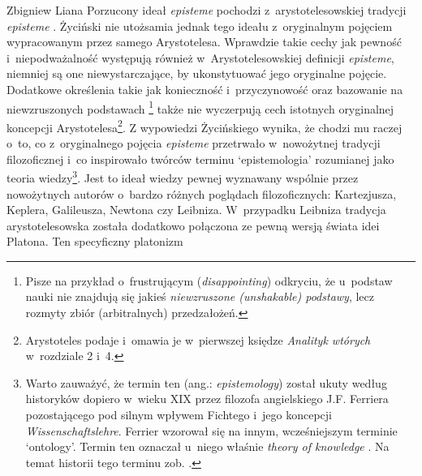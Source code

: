 \begin{artplenv}{Zbigniew Liana}
Porzucony ideał \textit{episteme} pochodzi z~arystotelesowskiej tradycji \textit{episteme}
\parencites[s.~102]{zycinski_jezyk_1983}[s.~46–55]{zycinski_granice_1993}.
Życiński nie utożsamia jednak tego ideału z~oryginalnym pojęciem wypracowanym
przez samego Arystotelesa. Wprawdzie takie cechy jak pewność i~niepodważalność występują również w~Arystotelesowskiej
definicji \textit{episteme}, niemniej są one niewystarczające, by ukonstytuować jego oryginalne pojęcie. Dodatkowe
określenia takie jak konieczność i~przyczynowość
\parencite[s.~46]{zycinski_granice_1993}
oraz bazowanie na
niewzruszonych podstawach
\parencites[s.~143]{zycinski_structure_1988}[s.~253]{zycinski_struktura_2013}\footnote{Pisze na
przykład o~frustrującym (\textit{disappointing})
odkryciu, że u~podstaw nauki nie znajdują się jakieś \textit{niewzruszone (unshakable) podstawy}, lecz rozmyty zbiór
(arbitralnych) przedzałożeń.} także nie wyczerpują cech istotnych oryginalnej koncepcji
Arystotelesa\footnote{Arystoteles podaje i~omawia je w~pierwszej księdze \textit{Analityk wtórych} w~rozdziale 2 i~4.}. Z
wypowiedzi Życińskiego
\parencite*[s.~46]{zycinski_granice_1993}
wynika, że chodzi mu raczej o~to, co z~oryginalnego
pojęcia \textit{episteme} przetrwało w~nowożytnej tradycji filozoficznej i~co inspirowało twórców terminu `epistemologia'
rozumianej jako teoria wiedzy\footnote{\label{lia-foo-32}Warto zauważyć, że termin ten (ang.: \textit{epistemology}) został ukuty według
historyków dopiero w~wieku XIX przez filozofa angielskiego J.F. Ferriera pozostającego pod silnym wpływem Fichtego i~jego
koncepcji \textit{Wissenschaftslehre}. Ferrier wzorował się na innym, wcześniejszym terminie `ontology'. Termin ten
oznaczał u~niego właśnie \textit{theory of knowledge}
\parencite[zob.][s.~44]{ferrier_institutes_1854}.
Na temat
historii tego terminu zob.
\parencite[s.~63–66]{sinacoer_lepistemologie_1973}.
}. Jest to ideał wiedzy pewnej
wyznawany wspólnie przez nowożytnych autorów o~bardzo różnych poglądach filozoficznych: Kartezjusza, Keplera,
Galileusza, Newtona czy Leibniza. W~przypadku Leibniza
\parencite[s.~51]{zycinski_granice_1993}
tradycja arystotelesowska została dodatkowo połączona ze pewną wersją świata idei Platona. Ten specyficzny platonizm

\end{artplenv}
